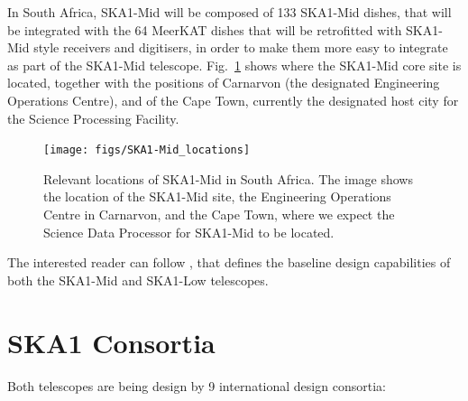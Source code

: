 \documentclass[a4paper,
               biblatex,       %
               keeplastbox,    %
               ]{jacow-2_1}    %
\begin{document}
In South Africa, SKA1-Mid will be composed of 133 SKA1-Mid dishes, that will be integrated with the 64 MeerKAT dishes that will be retrofitted with SKA1-Mid style receivers and digitisers, in order to make them more easy to integrate as part of the SKA1-Mid telescope.
Fig.~\ref{fig:figs_SKA1-Mid_locations} shows where the SKA1-Mid core site is located, together with the positions of Carnarvon (the designated Engineering Operations Centre), and of the Cape Town, currently the designated host city for the Science Processing Facility.

\begin{figure}[!htb]
  \centering
    \texttt{[image: figs/SKA1-Mid\_locations]}
  \caption{Relevant locations of SKA1-Mid in South Africa. The image shows the location of the SKA1-Mid site,  the Engineering Operations Centre in Carnarvon, and the Cape Town, where we expect the Science Data Processor for SKA1-Mid to be located.}
  \label{fig:figs_SKA1-Mid_locations}
\end{figure}

The interested reader can follow \cite{SKA-TEL-SKO-0000002_v3}, that defines the baseline design capabilities of both the SKA1-Mid and SKA1-Low telescopes.



\section{SKA1 Consortia} %
\label{sec:ska1_consortia}
Both telescopes are being design by 9 international design consortia:
\end{document}
